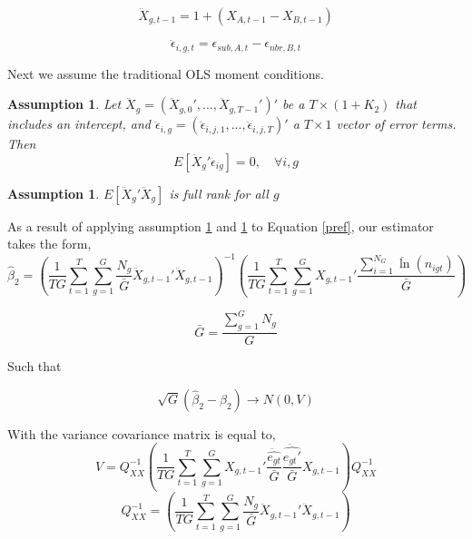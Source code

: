 \documentclass[12pt,a4paper]{article}
\newtheorem{assumption}[theorem]{Assumption}
\begin{document}
\begin{equation}
\ddot X_{g,t-1} = 1+(X_{A,t-1}-X_{B,t-1})
\end{equation}

\begin{equation}
\ddot \epsilon_{i,g,t} = \epsilon_{sub,A,t}-\epsilon_{nbr,B,t}
\end{equation}

Next we assume the traditional OLS moment conditions.

\begin{assumption}\label{noend}
Let  $\ddot X_{g} = (\ddot X_{g,0}', ... ,\ddot X_{g,T-1}')'$ be a $T \times (1+K_{2})$ that includes an intercept, and $\ddot \epsilon_{i,g} = (\ddot\epsilon_{i,j,1},...,\ddot\epsilon_{i,j,T})'$ a $T \times 1$ vector of error terms. Then 
\begin{equation}E[\ddot X_{g}'\ddot \epsilon_{ig}] = 0, \quad \forall i,g\end{equation}
\end{assumption}

\begin{assumption}\label{fullrank}
$E[\ddot X_{g}'\ddot X_{g}]$ is full rank for all $g$
\end{assumption}

As a result of applying assumption \ref{noend} and \ref{fullrank} to Equation \ref{pref}, our estimator takes the form,
\begin{equation}\label{pols_2s}
\hat \beta_{2} = \left(\frac{1}{TG} \sum_{t=1}^{T}\sum_{g=1}^{G}\frac{N_{g}}{\bar G}\ddot X_{g,t-1}'\ddot X_{g,t-1}\right)^{-1}\left(\frac{1}{TG}\sum_{t=1}^{T}\sum_{g=1}^{G}X_{g,t-1}'\frac{\sum_{i=1}^{N_{G}}\ddot \ln(n_{igt})}{\bar G}\right)
\end{equation}

\begin{equation}
\bar G = \frac{\sum_{g=1}^{G}N_{g}}{G}
\end{equation}

Such that

$$\sqrt{G}(\hat \beta_{2} - \beta_{2}) \to N(0,V)$$

With the variance covariance matrix is equal to,
\begin{equation} V = Q_{XX}^{-1}\left(\frac{1}{TG}\sum_{t=1}^{T}\sum_{g=1}^{G}X_{g,t-1}'\frac{\ddot{\hat{e_{gt}}}}{\bar G}\frac{\ddot{\hat{e_{gt}'}}}{\bar G}X_{g,t-1}\right)Q_{XX}^{-1} \end{equation}
$$ Q_{XX}^{-1} = \left(\frac{1}{TG} \sum_{t=1}^{T}\sum_{g=1}^{G}\frac{N_{g}}{\bar G}\ddot X_{g,t-1}'\ddot X_{g,t-1}\right) $$
\end{document}
